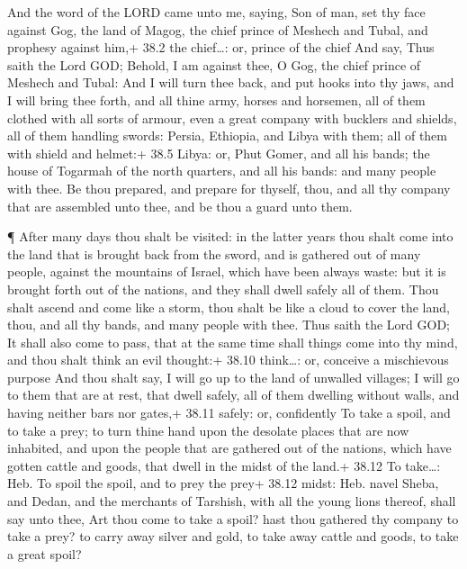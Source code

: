  And the word of the LORD came unto me, saying, 
Son of man, set thy face against Gog, the land of Magog, the chief
prince of Meshech and Tubal, and prophesy against him,+ 38.2 the
chief\ldots: or, prince of the chief  And say, Thus saith
the Lord GOD; Behold, I am against thee, O Gog, the chief prince of
Meshech and Tubal:  And I will turn thee back, and put hooks
into thy jaws, and I will bring thee forth, and all thine army, horses
and horsemen, all of them clothed with all sorts of armour, even a great
company with bucklers and shields, all of them handling swords:
 Persia, Ethiopia, and Libya with them; all of them with
shield and helmet:+ 38.5 Libya: or, Phut  Gomer, and all his
bands; the house of Togarmah of the north quarters, and all his bands:
and many people with thee.  Be thou prepared, and prepare
for thyself, thou, and all thy company that are assembled unto thee, and
be thou a guard unto them.

 ¶ After many days thou shalt be visited: in the latter
years thou shalt come into the land that is brought back from the sword,
and is gathered out of many people, against the mountains of Israel,
which have been always waste: but it is brought forth out of the
nations, and they shall dwell safely all of them.  Thou
shalt ascend and come like a storm, thou shalt be like a cloud to cover
the land, thou, and all thy bands, and many people with thee.
 Thus saith the Lord GOD; It shall also come to pass, that
at the same time shall things come into thy mind, and thou shalt think
an evil thought:+ 38.10 think\ldots: or, conceive a mischievous purpose
 And thou shalt say, I will go up to the land of unwalled
villages; I will go to them that are at rest, that dwell safely, all of
them dwelling without walls, and having neither bars nor gates,+ 38.11
safely: or, confidently  To take a spoil, and to take a
prey; to turn thine hand upon the desolate places that are now
inhabited, and upon the people that are gathered out of the nations,
which have gotten cattle and goods, that dwell in the midst of the
land.+ 38.12 To take\ldots: Heb. To spoil the spoil, and to prey the
prey+ 38.12 midst: Heb. navel  Sheba, and Dedan, and the
merchants of Tarshish, with all the young lions thereof, shall say unto
thee, Art thou come to take a spoil? hast thou gathered thy company to
take a prey? to carry away silver and gold, to take away cattle and
goods, to take a great spoil?

